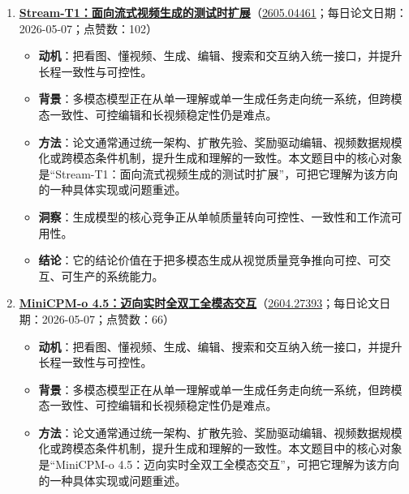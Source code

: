 \begin{enumerate}[leftmargin=1.5em]
\begin{itemize}[leftmargin=1.5em]
    \item \textbf{方法}：论文通常通过统一架构、扩散先验、奖励驱动编辑、视频数据规模化或跨模态条件机制，提升生成和理解的一致性。本文题目中的核心对象是“大基础模型中的音视觉智能”，可把它理解为该方向的一种具体实现或问题重述。
    \item \textbf{洞察}：生成模型的核心竞争正从单帧质量转向可控性、一致性和工作流可用性。
    \item \textbf{结论}：它的结论价值在于把多模态生成从视觉质量竞争推向可控、可交互、可生产的系统能力。
  \end{itemize}
  \item \textbf{\href{https://huggingface.co/papers/2605.04461}{Stream-T1：面向流式视频生成的测试时扩展}}（\href{https://arxiv.org/abs/2605.04461}{2605.04461}；每日论文日期：2026-05-07；点赞数：102）
  \begin{itemize}[leftmargin=1.5em]
    \item \textbf{动机}：把看图、懂视频、生成、编辑、搜索和交互纳入统一接口，并提升长程一致性与可控性。
    \item \textbf{背景}：多模态模型正在从单一理解或单一生成任务走向统一系统，但跨模态一致性、可控编辑和长视频稳定性仍是难点。
    \item \textbf{方法}：论文通常通过统一架构、扩散先验、奖励驱动编辑、视频数据规模化或跨模态条件机制，提升生成和理解的一致性。本文题目中的核心对象是“Stream-T1：面向流式视频生成的测试时扩展”，可把它理解为该方向的一种具体实现或问题重述。
    \item \textbf{洞察}：生成模型的核心竞争正从单帧质量转向可控性、一致性和工作流可用性。
    \item \textbf{结论}：它的结论价值在于把多模态生成从视觉质量竞争推向可控、可交互、可生产的系统能力。
  \end{itemize}
  \item \textbf{\href{https://huggingface.co/papers/2604.27393}{MiniCPM-o 4.5：迈向实时全双工全模态交互}}（\href{https://arxiv.org/abs/2604.27393}{2604.27393}；每日论文日期：2026-05-07；点赞数：66）
  \begin{itemize}[leftmargin=1.5em]
    \item \textbf{动机}：把看图、懂视频、生成、编辑、搜索和交互纳入统一接口，并提升长程一致性与可控性。
    \item \textbf{背景}：多模态模型正在从单一理解或单一生成任务走向统一系统，但跨模态一致性、可控编辑和长视频稳定性仍是难点。
    \item \textbf{方法}：论文通常通过统一架构、扩散先验、奖励驱动编辑、视频数据规模化或跨模态条件机制，提升生成和理解的一致性。本文题目中的核心对象是“MiniCPM-o 4.5：迈向实时全双工全模态交互”，可把它理解为该方向的一种具体实现或问题重述。

\end{itemize}
\end{enumerate}
